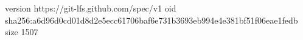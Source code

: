 version https://git-lfs.github.com/spec/v1
oid sha256:a6d96d0cd01d8d2e5ecc61706baf6e731b3693eb994e4e381bf51f06eae1fedb
size 1507
